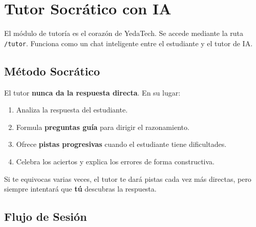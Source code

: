\documentclass[12pt, a4paper, oneside]{book}
\begin{document}
\chapter{Tutor Socrático con IA}

El módulo de tutoría es el corazón de YedaTech. Se accede mediante la ruta \texttt{/tutor}. Funciona como un chat inteligente entre el estudiante y el tutor de IA.

\section{Método Socrático}

El tutor \textbf{nunca da la respuesta directa}. En su lugar:
\begin{enumerate}
    \item Analiza la respuesta del estudiante.
    \item Formula \textbf{preguntas guía} para dirigir el razonamiento.
    \item Ofrece \textbf{pistas progresivas} cuando el estudiante tiene dificultades.
    \item Celebra los aciertos y explica los errores de forma constructiva.
\end{enumerate}

\begin{tipbox}
    Si te equivocas varias veces, el tutor te dará pistas cada vez más directas, pero siempre intentará que \textbf{tú} descubras la respuesta.
\end{tipbox}

\section{Flujo de Sesión}
\end{document}
